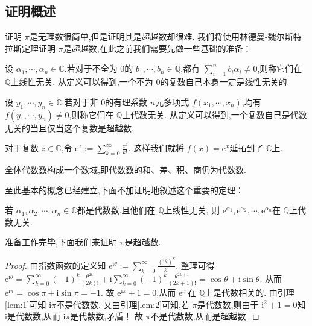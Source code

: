 \documentclass[main]{subfiles}
\begin{document}
\subsection{证明概述}
证明 \(\pi\)是无理数很简单,但是证明其是超越数却很难.
我们将使用林德曼-魏尔斯特拉斯定理证明 \(\pi\)是超越数,在此之前我们需要先做一些基础的准备：
\begin{definition}\label{def:2}
	设 \(\alpha_1,\cdots,\alpha_n \in \mathbb{C}\).若对于不全为 \(0\)的 \(b_1,\cdots,b_n \in \mathbb{Q}\),都有 \(\sum_{i=1}^{n} b_i \alpha_i \neq 0\),则称它们在 \(\mathbb{Q}\)上线性无关.
	从定义可以得到,一个不为 \(0\)的复数自己本身一定是线性无关的.

	设 \(y_1,\cdots,y_n \in \mathbb{C}\).若对于非 \(0\)的有理系数 \(n\)元多项式 \(f(x_1,\cdots,x_n)\),均有 \(f(y_1,\cdots,y_n) \neq 0\),则称它们在 \(\mathbb{Q}\)上代数无关.
	从定义可以得到,一个复数自己是代数无关的当且仅当这个复数是超越数.
\end{definition}
\begin{definition}\label{def:3}
	对于复数 \(z \in \mathbb{C}\),令 \(\mathrm{e}^z:=\sum_{k=0}^{\infty}\frac{z^k}{k!}\).
	这样我们就将 \(f(x)=\mathrm{e}^x\)延拓到了 \(\mathbb{C}\)上.
\end{definition}
\begin{lemma}\label{lem:2}
	全体代数数构成一个数域,即代数数的和、差、积、商仍为代数数.
\end{lemma}
至此基本的概念已经建立,下面不加证明地叙述这个重要的定理：
\begin{lemma}\label{lem:1}
	若 \(\alpha_1,\alpha_2,\cdots,\alpha_n \in \mathbb{C}\)都是代数数,且他们在 \(\mathbb{Q}\)上线性无关,
	则 \(\mathrm{e}^{\alpha_1},\mathrm{e}^{\alpha_2},\cdots,\mathrm{e}^{\alpha_n}\)在 \(\mathbb{Q}\)上代数无关.
\end{lemma}
准备工作完毕,下面我们来证明 \(\pi\)是超越数.
\begin{proof}
	由指数函数的定义知 \(\mathrm{e}^{\mathrm{i}\theta}:=\sum_{k=0}^{\infty}\frac{(\mathrm{i}\theta)^k}{k!}\).
	整理可得 \(\mathrm{e}^{\mathrm{i}\theta}=\sum_{k=0}^{\infty}(-1)^k\frac{\theta^{2k}}{(2k)!}+\mathrm{i}\sum_{k=0}^{\infty}(-1)^k\frac{\theta^{2k +1}}{(2k +1)!}=\cos \theta + \mathrm{i} \sin \theta\).
	从而 \(\mathrm{e}^{\mathrm{i}\pi}=\cos \pi + \mathrm{i}\sin \pi=-1\).
	故 \(\mathrm{e}^{\mathrm{i}\pi}+1=0\),从而 \(\mathrm{e}^{\mathrm{i}\pi}\)在 \(\mathbb{Q}\)上是代数相关的.
	由引理\ref{lem:1}可知 \(\mathrm{i}\pi\)不是代数数.
	又由引理\ref{lem:2}可知,若 \(\pi\)是代数数,则由于 \(\mathrm{i}^2+1=0\)知 \(\mathrm{i}\)是代数数,从而 \(\mathrm{i}\pi\)是代数数,矛盾！
	故 \(\pi\)不是代数数,从而是超越数.
\end{proof}
\end{document}
